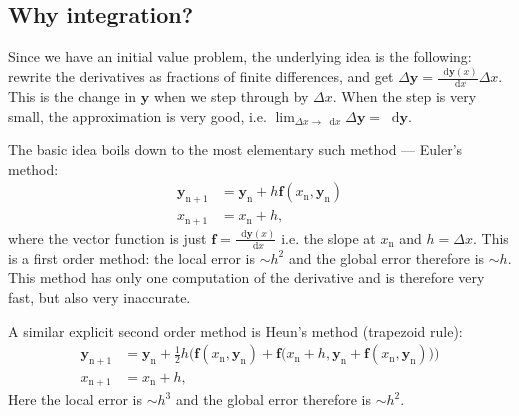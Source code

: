 \documentclass[]{article}
\newcommand{\dd}{\mathop{}\!\mathrm{d}}
\renewcommand{\vec}[1]{\boldsymbol{#1}}
\begin{document}
\subsection{Why integration?}\label{subsec:why-integ}
	Since we have an initial value problem, the underlying idea is the following: rewrite the derivatives as fractions of finite differences, and get $\Delta \vec{y} = \frac{\dd \vec{y}(x)}{\dd x} \Delta x$. This is the change in $\vec{y}$ when we step through by $\Delta x$. When the step is very small, the approximation is very good, i.e. $\lim_{\Delta x \rightarrow \dd x} \Delta \vec{y} = \dd \vec{y}$.

	The basic idea boils down to the most elementary such method --- Euler's method:
	\begin{align}
		\vec{y}_\mathrm{n+1} &= \vec{y}_\mathrm{n} + h \vec{f}(x_\mathrm{n}, \vec{y}_\mathrm{n})\\
		x_\mathrm{n+1} &= x_\mathrm{n} + h, \nonumber
	\end{align}
	where the vector function is just $\vec{f} = \frac{\dd \vec{y}(x)}{\dd x}$ i.e. the slope at $x_\mathrm{n}$ and $h = \Delta x$. This is a first order method: the local error is $\sim h^2$ and the global error therefore is $\sim h$. This method has only one computation of the derivative and is therefore very fast, but also very inaccurate.

	A similar explicit second order method is Heun's method (trapezoid rule):
	\begin{align}
		\vec{y}_\mathrm{n+1} &= \vec{y}_\mathrm{n} + \frac{1}{2} h \Big(\vec{f}(x_\mathrm{n}, \vec{y}_\mathrm{n}) + \vec{f}\big(x_\mathrm{n} + h, \vec{y}_\mathrm{n} + \vec{f}(x_\mathrm{n}, \vec{y}_\mathrm{n})\big)\Big)\\
		x_\mathrm{n+1} &= x_\mathrm{n} + h, \nonumber
	\end{align}
	Here the local error is $\sim h^3$ and the global error therefore is $\sim h^2$.
\end{document}
